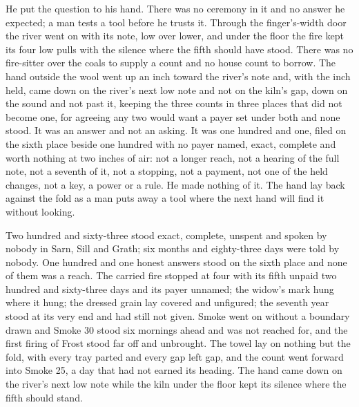 He put the question to his hand. There was no ceremony in it and no answer he expected; a man tests a tool before he trusts it. Through the finger's-width door the river went on with its note, low over lower, and under the floor the fire kept its four low pulls with the silence where the fifth should have stood. There was no fire-sitter over the coals to supply a count and no house count to borrow. The hand outside the wool went up an inch toward the river's note and, with the inch held, came down on the river's next low note and not on the kiln's gap, down on the sound and not past it, keeping the three counts in three places that did not become one, for agreeing any two would want a payer set under both and none stood. It was an answer and not an asking. It was one hundred and one, filed on the sixth place beside one hundred with no payer named, exact, complete and worth nothing at two inches of air: not a longer reach, not a hearing of the full note, not a seventh of it, not a stopping, not a payment, not one of the held changes, not a key, a power or a rule. He made nothing of it. The hand lay back against the fold as a man puts away a tool where the next hand will find it without looking.

Two hundred and sixty-three stood exact, complete, unspent and spoken by nobody in Sarn, Sill and Grath; six months and eighty-three days were told by nobody. One hundred and one honest answers stood on the sixth place and none of them was a reach. The carried fire stopped at four with its fifth unpaid two hundred and sixty-three days and its payer unnamed; the widow's mark hung where it hung; the dressed grain lay covered and unfigured; the seventh year stood at its very end and had still not given. Smoke went on without a boundary drawn and Smoke 30 stood six mornings ahead and was not reached for, and the first firing of Frost stood far off and unbrought. The towel lay on nothing but the fold, with every tray parted and every gap left gap, and the count went forward into Smoke 25, a day that had not earned its heading. The hand came down on the river's next low note while the kiln under the floor kept its silence where the fifth should stand.
